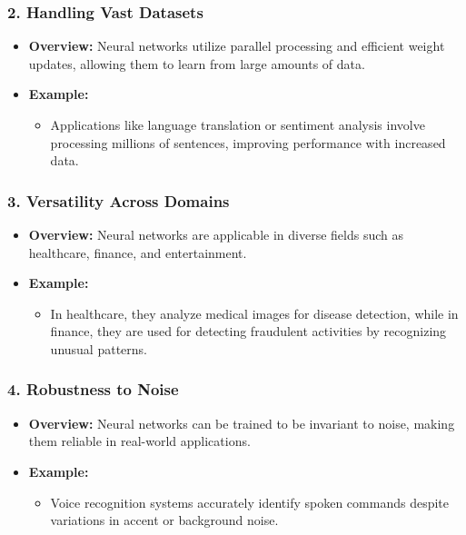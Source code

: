 \documentclass[aspectratio=169]{beamer}
\begin{document}
\begin{frame}[fragile]
    \frametitle{2. Handling Vast Datasets}
    \begin{itemize}
        \item \textbf{Overview:} Neural networks utilize parallel processing and efficient weight updates, allowing them to learn from large amounts of data.
        \item \textbf{Example:} 
        \begin{itemize}
            \item Applications like language translation or sentiment analysis involve processing millions of sentences, improving performance with increased data.
        \end{itemize}
    \end{itemize}
\end{frame}

\begin{frame}[fragile]
    \frametitle{3. Versatility Across Domains}
    \begin{itemize}
        \item \textbf{Overview:} Neural networks are applicable in diverse fields such as healthcare, finance, and entertainment.
        \item \textbf{Example:} 
        \begin{itemize}
            \item In healthcare, they analyze medical images for disease detection, while in finance, they are used for detecting fraudulent activities by recognizing unusual patterns.
        \end{itemize}
    \end{itemize}
\end{frame}

\begin{frame}[fragile]
    \frametitle{4. Robustness to Noise}
    \begin{itemize}
        \item \textbf{Overview:} Neural networks can be trained to be invariant to noise, making them reliable in real-world applications.
        \item \textbf{Example:} 
        \begin{itemize}
            \item Voice recognition systems accurately identify spoken commands despite variations in accent or background noise.
        \end{itemize}
    \end{itemize}
\end{frame}
\end{document}
